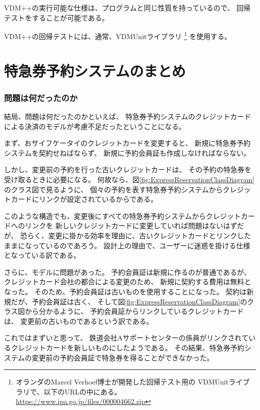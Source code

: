 VDM++の実行可能な仕様は、プログラムと同じ性質を持っているので、
回帰テストをすることが可能である。

VDM++の回帰テストには、通常、VDMUnitライブラリ
\footnote{
	オランダのMarcel Verhoef博士が開発した回帰テスト用の
	VDMUnitライブラリで、以下のURLの中にある。\url{https://www.ipa.go.jp/files/000004662.zip}
}
を使用する。


\section {特急券予約システムのまとめ}

	\subsubsection {問題は何だったのか}
結局、問題は何だったのかといえば、
特急券予約システムのクレジットカードによる決済のモデルが考慮不足だったということになる。

まず、おサイフケータイのクレジットカードを変更すると、
新規に特急券予約システムを契約せねばならず、
新規に予約会員証も作成しなければならない。

しかし、変更前の予約を行った古いクレジットカードは、
その予約の特急券を受け取るときに必要になる。
何故なら、図\ref{fig:ExpressReservationClassDiagram}のクラス図で見るように、
個々の予約を表す特急券予約システムからクレジットカードにリンクが設定されているからである。

このような構造でも、変更後にすべての特急券予約システムからクレジットカードへのリンクを
新しいクレジットカードに変更していれば問題はないはずだが、
恐らく、変更に掛かる効率を理由に、古いクレジットカードとリンクしたままになっているのであろう。
設計上の理由で、ユーザーに迷惑を掛ける仕様となっている訳である。

さらに、モデルに問題があった。
予約会員証は新規に作るのが普通であるが、
クレジットカード会社の都合による変更のため、
新規に契約する費用は無料となった。
そのため、予約会員証は古いものを使用することになった。
契約は新規だが、予約会員証は古く、
そして図\ref{fig:ExpressReservationClassDiagram}のクラス図から分かるように、
予約会員証からリンクしているクレジットカードは、
変更前の古いものであるという訳である。

これではまずいと思って、
鉄道会社Aサポートセンターの係員がリンクされているクレジットカードを新しいものにしたようである。
その結果、特急券予約システムの変更前の予約会員証で特急券を得ることができなかった。


